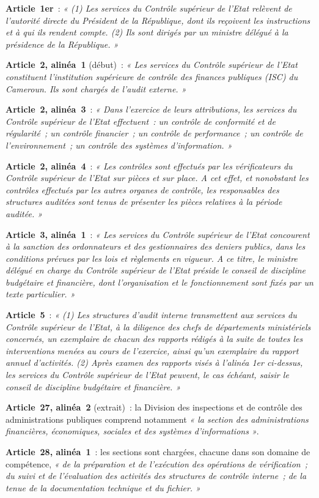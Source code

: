 \begin{boxjuris}
\textbf{Article~1er}~: \textit{« (1) Les services du Contrôle supérieur de
l'Etat relèvent de l'autorité directe du Président de la République, dont
ils reçoivent les instructions et à qui ils rendent compte. (2) Ils sont
dirigés par un ministre délégué à la présidence de la République. »}

\medskip
\textbf{Article~2, alinéa~1} (début)~: \textit{« Les services du Contrôle
supérieur de l'Etat constituent l'institution supérieure de contrôle des
finances publiques (ISC) du Cameroun. Ils sont chargés de l'audit
externe. »}

\medskip
\textbf{Article~2, alinéa~3}~: \textit{« Dans l'exercice de leurs
attributions, les services du Contrôle supérieur de l'Etat effectuent~:
un contrôle de conformité et de régularité~; un contrôle financier~; un
contrôle de performance~; un contrôle de l'environnement~; un contrôle des
systèmes d'information. »}

\medskip
\textbf{Article~2, alinéa~4}~: \textit{« Les contrôles sont effectués par
les vérificateurs du Contrôle supérieur de l'Etat sur pièces et sur place.
A cet effet, et nonobstant les contrôles effectués par les autres organes
de contrôle, les responsables des structures auditées sont tenus de
présenter les pièces relatives à la période auditée. »}

\medskip
\textbf{Article~3, alinéa~1}~: \textit{« Les services du Contrôle supérieur
de l'Etat concourent à la sanction des ordonnateurs et des gestionnaires
des deniers publics, dans les conditions prévues par les lois et
règlements en vigueur. A ce titre, le ministre délégué en charge du
Contrôle supérieur de l'Etat préside le conseil de discipline budgétaire
et financière, dont l'organisation et le fonctionnement sont fixés par un
texte particulier. »}

\medskip
\textbf{Article~5}~: \textit{« (1) Les structures d'audit interne
transmettent aux services du Contrôle supérieur de l'Etat, à la diligence
des chefs de départements ministériels concernés, un exemplaire de chacun
des rapports rédigés à la suite de toutes les interventions menées au
cours de l'exercice, ainsi qu'un exemplaire du rapport annuel d'activités.
(2) Après examen des rapports visés à l'alinéa 1er ci-dessus, les services
du Contrôle supérieur de l'Etat peuvent, le cas échéant, saisir le
conseil de discipline budgétaire et financière. »}

\medskip
\textbf{Article~27, alinéa~2} (extrait)~: la Division des inspections et
de contrôle des administrations publiques comprend notamment \textit{« la
section des administrations financières, économiques, sociales et des
systèmes d'informations »}.

\medskip
\textbf{Article~28, alinéa~1}~: les sections sont chargées, chacune dans
son domaine de compétence, \textit{« de la préparation et de l'exécution
des opérations de vérification~; du suivi et de l'évaluation des
activités des structures de contrôle interne~; de la tenue de la
documentation technique et du fichier. »}
\end{boxjuris}

